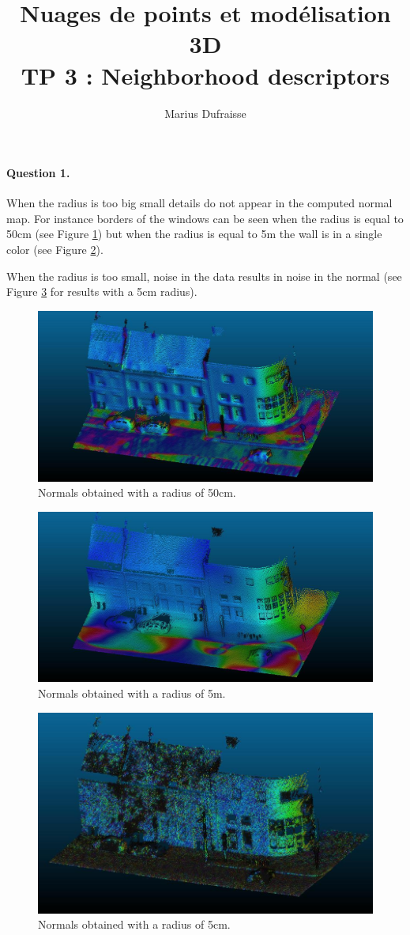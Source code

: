 \documentclass[french]{article}
\begin{document}
\title{Nuages de points et modélisation 3D\\
TP 3 : Neighborhood descriptors}
\author{Marius Dufraisse}
\date{}

\maketitle


\paragraph{Question 1.} When the radius is too big small details do not appear in the computed normal map. For instance borders of the windows can be seen when the radius is equal to 50cm (see Figure \ref{fig:q1-50cm}) but when the radius is equal to 5m the wall is in a single color (see Figure \ref{fig:q1-5m}).

When the radius is too small, noise in the data results in noise in the normal (see Figure \ref{fig:q1-5cm} for results with a 5cm radius).



\begin{figure}[h]
	\centering
	\includegraphics[width=0.6\linewidth]{q1-r50cm.jpg}
	\caption{Normals obtained with a radius of 50cm.}
	\label{fig:q1-50cm}
\end{figure}

\begin{figure}[h]
	\centering
	\includegraphics[width=0.6\linewidth]{q1-r5m.jpg}
	\caption{Normals obtained with a radius of 5m.}
	\label{fig:q1-5m}
\end{figure}

\begin{figure}[h]
	\centering
	\includegraphics[width=0.6\linewidth]{q1-r5cm.jpg}
	\caption{Normals obtained with a radius of 5cm.}
	\label{fig:q1-5cm}
\end{figure}
\end{document}
